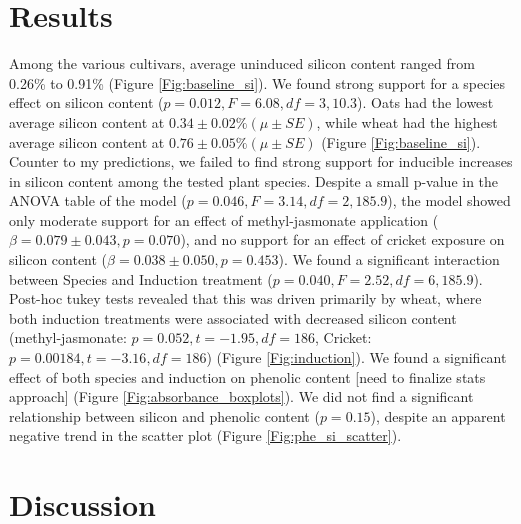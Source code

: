 \documentclass[12pt, letterpaper, ]{report}
\begin{document}
\section{Results}
Among the various cultivars, average uninduced silicon content ranged from 0.26\% to 0.91\% (Figure \ref{Fig:baseline_si}). We found strong support for a species effect on silicon content ($p=0.012, F = 6.08, df=3,10.3$). Oats had the lowest average silicon content at $0.34 \pm 0.02\% (\mu \pm SE)$, while wheat had the highest average silicon content at $0.76 \pm 0.05\% (\mu \pm SE)$ (Figure \ref{Fig:baseline_si}). Counter to my predictions, we failed to find strong support for inducible increases in silicon content among the tested plant species. Despite a small p-value in the ANOVA table of the model ($p = 0.046, F = 3.14, df = 2,185.9$), the model showed only moderate support for an effect of methyl-jasmonate application ($\beta = 0.079 \pm 0.043, p = 0.070$), and no support for an effect of cricket exposure on silicon content ($\beta = 0.038 \pm 0.050, p = 0.453$). We found a significant interaction between Species and Induction treatment ($p = 0.040, F = 2.52, df = 6,185.9$). Post-hoc tukey tests revealed that this was driven primarily by wheat, where both induction treatments were associated with decreased silicon content (methyl-jasmonate: $p = 0.052, t = -1.95, df = 186$, Cricket: $p = 0.00184, t = -3.16, df = 186$) (Figure \ref{Fig:induction}).
We found a significant effect of both species and induction on phenolic content [need to finalize stats approach] (Figure \ref{Fig:absorbance_boxplots}).
We did not find a significant relationship between silicon and phenolic content ($p = 0.15$), despite an apparent negative trend in the scatter plot (Figure \ref{Fig:phe_si_scatter}).

\section{Discussion}
\end{document}

